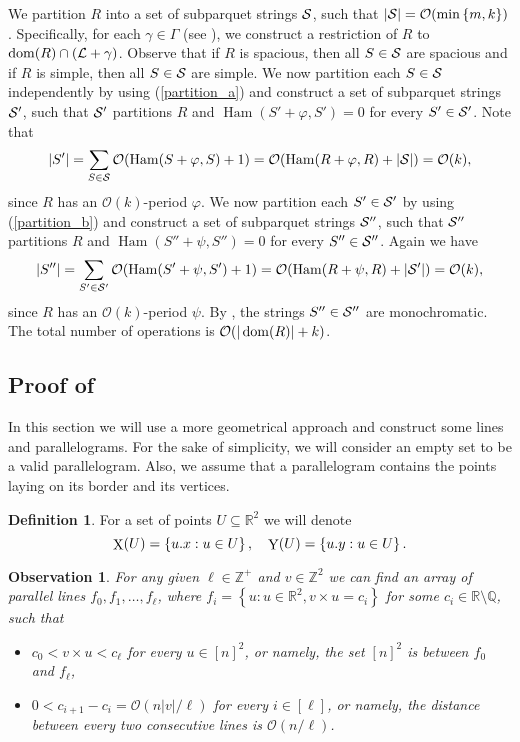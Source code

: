 \documentclass[11pt]{article}
\newcommand{\R}{\mathbb{R}}
\newcommand{\Z}{\mathbb{Z}}
\renewcommand{\O}{\mathcal{O}}
\renewcommand{\phi}{\varphi}
\newcommand{\set}[1]{\left\lbrace #1 \right\rbrace}
\theoremstyle{plain}
\newtheorem{observation}{Observation}
\theoremstyle{definition}
\newtheorem{definition}{Definition}
\theoremstyle{remark}
\DeclareMathOperator*{\X}{X}
\DeclareMathOperator*{\Y}{Y}
\DeclareMathOperator*{\Ham}{Ham}
\begin{document}
We partition $R$ into a set of subparquet strings $\S$, such that $|\S| = \O(\min\set{m, k})$.
Specifically, for each $\gamma \in \Gamma$ (see ), we construct a restriction of $R$ to $\d{R} \cap (\L + \gamma)$.
Observe that if $R$ is spacious, then all $S \in \S$ are spacious and if $R$ is simple, then all $S \in \S$ are simple.
We now partition each $S \in \S$ independently by using  (\ref{partition_a})
and construct a set of subparquet strings $\S'$, such that $\S'$ partitions $R$ and $\Ham(S' + \phi, S') = 0$ for every $S' \in \S'$.
Note that
$$ |S'| = \sum_{S \in \S} \O(\Ham(S + \phi, S) + 1) = \O(\Ham(R + \phi, R) + |\S|) = \O(k),$$
since $R$ has an $\O(k)$-period $\phi$.
We now partition each $S' \in \S'$ by using  (\ref{partition_b}) and construct a set of subparquet strings $\S''$, such that $\S''$ partitions $R$ and $\Ham(S'' + \psi, S'') = 0$ for every $S'' \in \S''$.
Again we have
$$ |S''| = \sum_{S' \in \S'} \O(\Ham(S' + \psi, S') + 1) = \O(\Ham(R + \psi, R) + |\S'|) = \O(k),$$
since $R$ has an $\O(k)$-period $\psi$.
By , the strings $S'' \in \S''$ are monochromatic.
The total number of operations is $\O(|\d{R}| + k)$.

\subsection{Proof of } \label{text_decomposition_proof}

In this section we will use a more geometrical approach and construct some lines and parallelograms.
For the sake of simplicity, we will consider an empty set to be a valid parallelogram.
Also, we assume that a parallelogram contains the points laying on its border and its vertices.

\begin{definition}
	For a set of points $U \subseteq \R^2$ we will denote
	$$ \X(U) = \set{\x{u} : u \in U}, \quad \Y(U) = \set{\y{u} : u \in U}.$$
\end{definition}

\newcommand{\IQ}{\mathbb{R} \setminus \mathbb{Q}}
\begin{observation}\label{line_existence}
	For any given $\ell \in \Z^+$ and $v \in \Z^2$ we can find an array of parallel lines $f_0, f_1, \dots, f_\ell$, where $f_i = \set{u : u \in \R^2, v \times u = c_i}$ for some $c_i \in \IQ$, such that
	\begin{itemize}
		\item $c_0 < v \times u < c_\ell$ for every $u \in [n]^2$, or namely, the set $[n]^2$ is between $f_0$ and $f_\ell$,
		\item $0 < c_{i + 1} - c_i = \O(n|v| / \ell)$ for every $i \in [\ell]$, or namely, the distance between every two consecutive lines is $\O(n / \ell)$.
	\end{itemize}
\end{observation}
\end{document}
